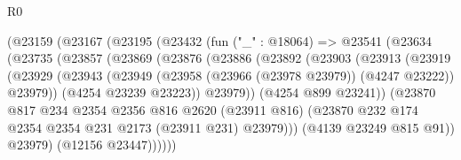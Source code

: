\begin{lexlean}{R0}
\begin{coremodule}
                        (@23159
                          (@23167
                            (@23195
                              (@23432
                                (fun ("_" : @18064) =>
                                @23541
                                  (@23634
                                    (@23735
                                      (@23857
                                        (@23869
                                          (@23876
                                            (@23886
                                              (@23892
                                                (@23903
                                                  (@23913
                                                    (@23919
                                                      (@23929
                                                        (@23943
                                                          (@23949
                                                            (@23958
                                                              (@23966 (@23978 @23979))
                                                              (@4247 @23222))
                                                            @23979))
                                                        (@4254 @23239 @23223))
                                                      @23979))
                                                  (@4254 @899 @23241))
                                                (@23870
                                                  @817
                                                  @234
                                                  @2354
                                                  @2356
                                                  @816
                                                  @2620
                                                  (@23911 @816)
                                                  (@23870
                                                    @232
                                                    @174
                                                    @2354
                                                    @2354
                                                    @231
                                                    @2173
                                                    (@23911 @231)
                                                    @23979)))
                                              (@4139 @23249 @815 @91))
                                            @23979)
                                          (@12156 @23447))))))

\end{coremodule}
\end{lexlean}
